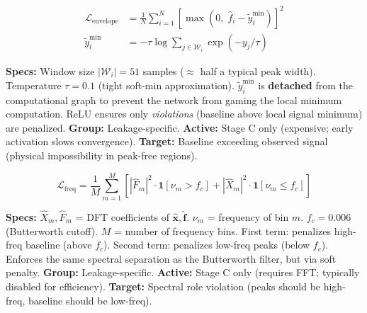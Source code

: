 \documentclass[11pt, letterpaper]{article}
\begin{document}
\vspace{0.3em}

\begin{questionbox}
\normalfont
\begin{align*}
\mathcal{L}_{\text{envelope}} &= \frac{1}{N}\sum_{i=1}^{N}\left[\max\!\left(0,\;\hat{f}_i - \tilde{y}_i^{\min}\right)\right]^2 \\
\tilde{y}_i^{\min} &= -\tau \log \sum_{j \in \mathcal{W}_i} \exp(-y_j/\tau)
\end{align*}
\end{questionbox}
\begin{answerbox}
\textbf{Specs:} Window size $|\mathcal{W}_i| = 51$ samples ($\approx$ half a typical peak width).
Temperature $\tau = 0.1$ (tight soft-min approximation).  $\tilde{y}_i^{\min}$ is \textbf{detached}
from the computational graph to prevent the network from gaming the local minimum computation.
ReLU ensures only \emph{violations} (baseline above local signal minimum) are penalized.
\textbf{Group:} Leakage-specific.  \textbf{Active:} Stage C only (expensive; early activation slows convergence).
\textbf{Target:} Baseline exceeding observed signal (physical impossibility in peak-free regions).
\end{answerbox}

\vspace{0.3em}

\begin{questionbox}
\normalfont
$$
\mathcal{L}_{\text{freq}} = \frac{1}{M}\sum_{m=1}^{M}\left[|\hat{F}_m|^2 \cdot \mathbf{1}[\nu_m > f_c] + |\hat{X}_m|^2 \cdot \mathbf{1}[\nu_m \leq f_c]\right]
$$
\end{questionbox}
\begin{answerbox}
\textbf{Specs:} $\hat{X}_m, \hat{F}_m$ = DFT coefficients of $\hat{\mathbf{x}}, \hat{\mathbf{f}}$.
$\nu_m$ = frequency of bin $m$.  $f_c = 0.006$ (Butterworth cutoff).  $M$ = number of frequency bins.
First term: penalizes high-freq baseline (above $f_c$).
Second term: penalizes low-freq peaks (below $f_c$).
Enforces the same spectral separation as the Butterworth filter, but via soft penalty.
\textbf{Group:} Leakage-specific.  \textbf{Active:} Stage C only (requires FFT; typically disabled for efficiency).
\textbf{Target:} Spectral role violation (peaks should be high-freq, baseline should be low-freq).
\end{answerbox}
\end{document}
